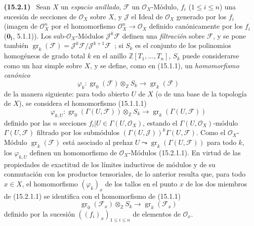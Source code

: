 \documentclass[10pt,oneside]{book}
\makeatletter
\newcommand{\gr}{\operatorname{gr}}
\newcommand{\setmanualcurrentlabel}[1]{\def\@currentlabel{#1}}
\newcommand{\oldpage}[2][]{%
  \setcounter{footnote}{0}%
  \marginpar{\scriptsize\textbf{#1}~|~#2}\ignorespaces}
\newenvironment{env}[1][]{\setmanualcurrentlabel{#1}\par\medskip\noindent\textbf{(#1)}\ }{\par}
\makeatother
\begin{document}
\begin{env}[15.2.1]
\label{0.15.2.1-es}
Sean $X$ un \emph{espacio anillado}, $\mathscr{F}$ un $\mathcal{O}_X$-Módulo,
$f_i$ ($1\leq i\leq n$) una sucesión de secciones de $\mathcal{O}_X$ sobre
$X$, y $\mathscr{J}$ el Ideal de $\mathcal{O}_X$ generado por los $f_i$
(imagen de $\mathcal{O}_X^n$ por el homomorfismo
$\mathcal{O}_X^n\to\mathcal{O}_X$ definido canónicamente por los $f_i$
($\mathbf{0}_{\mathrm I}$, 5.1.1)). Los sub-$\mathcal{O}_X$-Módulos
$\mathscr{J}^k\mathscr{F}$ definen una \emph{filtración} sobre $\mathscr{F}$, y
se pone también
$\gr_k(\mathscr{F})=\mathscr{J}^k\mathscr{F}/\mathscr{J}^{k+1}\mathscr{F}$~;
si $S_k$ es el conjunto de los polinomios homogéneos de grado total $k$ en
el anillo $\mathbb{Z}[T_1,\ldots,T_n]$, $S_k$ puede considerarse como un
haz simple sobre $X$, y se define, como en (15.1.1), un \emph{homomorfismo
canónico}
\[
\label{0.15.2.1.1-es}
  \varphi_k:\gr_0(\mathscr{F})\otimes_{\mathbb Z}S_k
  \longrightarrow\gr_k(\mathscr F)
\tag{15.2.1.1}
\]
\oldpage[0\textsubscript{IV-1}]{21}
de la manera siguiente: para todo abierto $U$ de $X$ (o de una base de la
topología de $X$), se considera el homomorfismo (15.1.1.1)
\[
  \varphi_{k,U}:\gr_0(\Gamma(U,\mathscr{F}))\otimes_{\mathbb Z}S_k
  \longrightarrow\gr_k(\Gamma(U,\mathscr{F}))
\]
definido por las $n$ secciones $f_i|U\in\Gamma(U,\mathcal{O}_X)$, estando el
$\Gamma(U,\mathcal{O}_X)$-módulo $\Gamma(U,\mathscr{F})$ filtrado por los
submódulos $(\Gamma(U,\mathscr{J}))^k\Gamma(U,\mathscr{F})$. Como el
$\mathcal{O}_X$-Módulo $\gr_k(\mathscr{F})$ está asociado al prehaz
$U\leadsto\gr_k(\Gamma(U,\mathscr{F}))$ para todo $k$, los $\varphi_{k,U}$
definen un homomorfismo de $\mathcal{O}_X$-Módulos (15.2.1.1). En virtud
de las propiedades de exactitud de los límites inductivos de módulos y de su
conmutación con los productos tensoriales, de lo anterior resulta que, para
todo $x\in X$, el homomorfismo $(\varphi_k)_x$ de los tallos en el punto $x$
de los dos miembros de (15.2.1.1) se identifica con el homomorfismo de (15.1.1)
\[
\label{0.15.2.1.2-es}
  \gr_0(\mathscr{F}_x)\otimes_{\mathbb Z}S_k
  \longrightarrow\gr_k(\mathscr{F}_x)
\tag{15.2.1.2}
\]
definido por la sucesión $((f_i)_x)_{1\leq i\leq n}$ de elementos de
$\mathcal{O}_x$.
\end{env}
\end{document}
